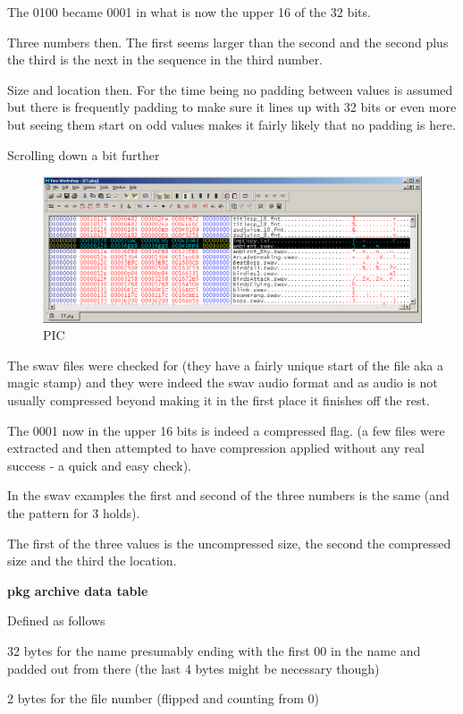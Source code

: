 \documentclass[
]{book}
\begin{document}
The 0100 became 0001 in what is now the upper 16 of the 32 bits.

Three numbers then. The first seems larger than the second and the second plus the third is the next in the sequence in the third number.

Size and location then. For the time being no padding between values is assumed but there is frequently padding to make sure it lines up with 32 bits or even more but seeing them start on odd values makes it fairly likely that no padding is here.

Scrolling down a bit further

\begin{figure}
\centering
\includegraphics{images/130_home_fast6191_romhackingguide_unrenamed_fil___al_borders_romhackingguidearchive_eltigre_4.png}
\caption{PIC}
\end{figure}

The swav files were checked for (they have a fairly unique start of the file aka a magic stamp) and they were indeed the swav audio format and as audio is not usually compressed beyond making it in the first place it finishes off the rest.

The 0001 now in the upper 16 bits is indeed a compressed flag. (a few files were extracted and then attempted to have compression applied without any real success - a quick and easy check).

In the swav examples the first and second of the three numbers is the same (and the pattern for 3 holds).

The first of the three values is the uncompressed size, the second the compressed size and the third the location.

\textbf{pkg archive data table}

Defined as follows

32 bytes for the name presumably ending with the first 00 in the name and padded out from there (the last 4 bytes might be necessary though)

2 bytes for the file number (flipped and counting from 0)
\end{document}
